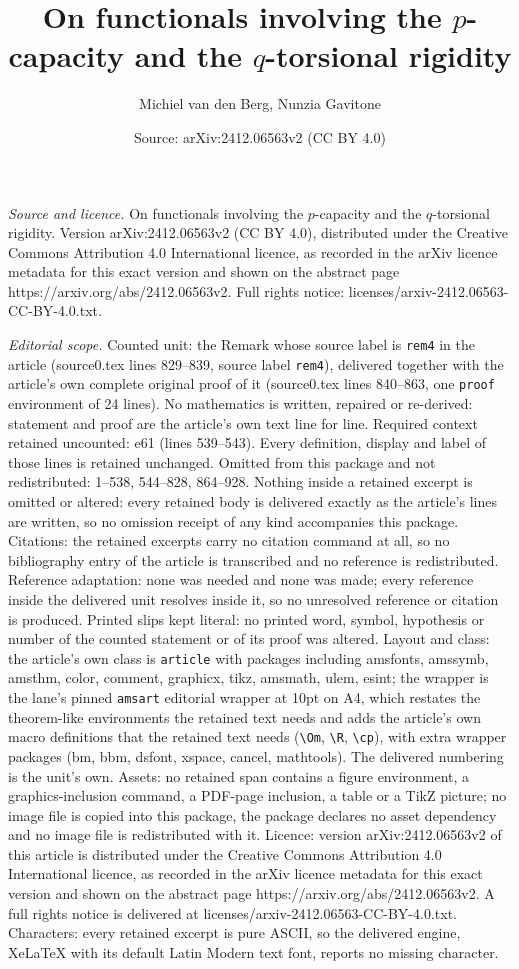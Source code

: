 \documentclass[10pt,a4paper]{amsart}
\title[On functionals involving the $p$-capacity and the $q$-torsio]{On functionals involving the $p$-capacity and the $q$-torsional rigidity}
\author{Michiel van den Berg, Nunzia Gavitone}
\date{Source: arXiv:2412.06563v2 (CC BY 4.0)}
\begin{document}
\maketitle

\noindent\emph{Source and licence.} On functionals involving the $p$-capacity and the $q$-torsional rigidity. Version arXiv:2412.06563v2 (CC BY 4.0), distributed under the Creative Commons Attribution 4.0 International licence, as recorded in the arXiv licence metadata for this exact version and shown on the abstract page https://arxiv.org/abs/2412.06563v2. Full rights notice: licenses/arxiv-2412.06563-CC-BY-4.0.txt.\par\smallskip

\noindent\textit{Editorial scope.} Counted unit: the Remark whose source label is \texttt{rem4} in the article (source0.tex lines 829--839, source label \texttt{rem4}), delivered together with the article's own complete original proof of it (source0.tex lines 840--863, one \texttt{proof} environment of 24 lines). No mathematics is written, repaired or re-derived: statement and proof are the article's own text line for line. Required context retained uncounted: e61 (lines 539--543). Every definition, display and label of those lines is retained unchanged. Omitted from this package and not redistributed: 1--538, 544--828, 864--928. Nothing inside a retained excerpt is omitted or altered: every retained body is delivered exactly as the article's lines are written, so no omission receipt of any kind accompanies this package. Citations: the retained excerpts carry no citation command at all, so no bibliography entry of the article is transcribed and no reference is redistributed. Reference adaptation: none was needed and none was made; every reference inside the delivered unit resolves inside it, so no unresolved reference or citation is produced. Printed slips kept literal: no printed word, symbol, hypothesis or number of the counted statement or of its proof was altered. Layout and class: the article's own class is \texttt{article} with packages including amsfonts, amssymb, amsthm, color, comment, graphicx, tikz, amsmath, ulem, esint; the wrapper is the lane's pinned \texttt{amsart} editorial wrapper at 10pt on A4, which restates the theorem-like environments the retained text needs and adds the article's own macro definitions that the retained text needs (\texttt{\textbackslash Om}, \texttt{\textbackslash R}, \texttt{\textbackslash cp}), with extra wrapper packages (bm, bbm, dsfont, xspace, cancel, mathtools). The delivered numbering is the unit's own. Assets: no retained span contains a figure environment, a graphics-inclusion command, a PDF-page inclusion, a table or a TikZ picture; no image file is copied into this package, the package declares no asset dependency and no image file is redistributed with it. Licence: version arXiv:2412.06563v2 of this article is distributed under the Creative Commons Attribution 4.0 International licence, as recorded in the arXiv licence metadata for this exact version and shown on the abstract page https://arxiv.org/abs/2412.06563v2. A full rights notice is delivered at licenses/arxiv-2412.06563-CC-BY-4.0.txt. Characters: every retained excerpt is pure ASCII, so the delivered engine, XeLaTeX with its default Latin Modern text font, reports no missing character.
\end{document}
